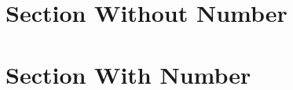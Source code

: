 \documentclass[12pt]{article}
\begin{document}

\section*{Section Without Number}


\section{Section With Number}


\end{document}
